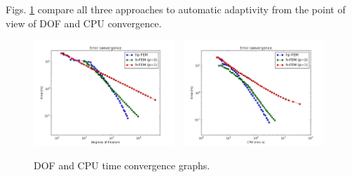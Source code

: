 \documentclass[12pt]{elsarticle}
\begin{document}

%

Figs. \ref{fig:nist-3-conv} compare all
three approaches to automatic adaptivity from the point
of view of DOF and CPU convergence.

\begin{figure}[H]
\centering
\includegraphics[height=4cm]{nist/nist-3/conv_dof_aniso.png}\ \
\includegraphics[height=4cm]{nist/nist-3/conv_cpu_aniso.png}
\caption{DOF and CPU time convergence graphs.}
\label{fig:nist-3-conv}
\end{figure}
\end{document}
